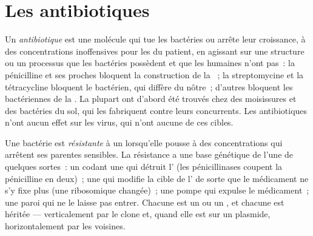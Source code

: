 \section{Les antibiotiques}

\begin{definition}[Antibiotique]\label{def:g11:antibiotic-resistance:antibiotic}
Un \emph{antibiotique} est une molécule qui tue les
bactéries ou arrête leur croissance, à des concentrations inoffensives
pour les  du patient, en agissant sur une structure ou un
processus que les bactéries possèdent et que les  humaines
n'ont pas~: la pénicilline et ses proches bloquent la construction de
la ~; la streptomycine et la tétracycline bloquent le
 bactérien, qui diffère du nôtre~; d'autres bloquent les
 bactériennes de la . La plupart ont d'abord
été trouvés chez des moisissures et des bactéries du sol, qui les
fabriquent contre leurs concurrents. Les antibiotiques n'ont aucun
effet sur les virus, qui n'ont aucune de ces cibles.
\end{definition}

\begin{proposition}\label{prop:g11:antibiotic-resistance:mechanisms}
Une bactérie est \emph{résistante} à
un  lorsqu'elle pousse à des concentrations qui arrêtent
ses parentes sensibles. La résistance a une base génétique de l'une de
quelques sortes~: un  codant une  qui détruit l'
(les pénicillinases coupent la pénicilline en deux)~; une  qui
modifie la cible de l' de sorte que le médicament ne s'y
fixe plus (une  ribosomique changée)~; une pompe qui expulse le
médicament~; une paroi qui ne le laisse pas entrer. Chacune est un
 ou un , et chacune est héritée --- verticalement par le
clone et, quand elle est sur un plasmide, horizontalement par les
voisines.
\end{proposition}
\admitted

